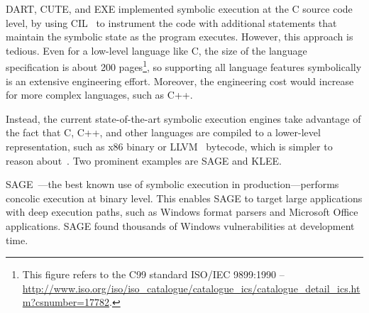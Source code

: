 DART, CUTE, and EXE implemented symbolic execution at the C source code level, by using CIL~\cite{cil} to instrument the code with additional statements that maintain the symbolic state as the program executes.
%
However, this approach is tedious.  Even for a low-level language like C, the size of the language specification is about 200 pages\footnote{This figure refers to the C99 standard ISO/IEC 9899:1990 -- {\url{http://www.iso.org/iso/iso_catalogue/catalogue_ics/catalogue_detail_ics.htm?csnumber=17782}}.}, so supporting all language features symbolically is an extensive engineering effort.  Moreover, the engineering cost would increase for more complex languages, such as C++.


Instead, the current state-of-the-art symbolic execution engines take advantage of the fact that C, C++, and other languages are compiled to a lower-level representation, such as x86 binary or LLVM~\cite{llvm} bytecode, which is simpler to reason about~\cite{godefroid:fuzz,klee,bitBlaze,s2eSystem,mayhem}.  Two prominent examples are SAGE and KLEE.

SAGE~\cite{sage2012,godefroid:fuzz}---the best known use of symbolic execution in production---performs concolic execution at binary level.
%
This enables SAGE to target large applications with deep execution paths, such as Windows format parsers and Microsoft Office applications.
%
SAGE found thousands of Windows vulnerabilities at development time.


